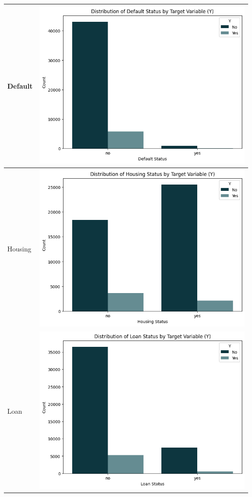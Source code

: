 \documentclass{article}
\begin{document}
\begin{longtable}{|l|c|}
               Default & \includegraphics[width=0.7\linewidth]{data/bank_marketing/pic/Bank_def.png} \\ \hline 
               Housing & \includegraphics[width=0.7\linewidth]{data/bank_marketing/pic/Bank_Hous.png} \\ \hline
               Loan & \includegraphics[width=0.7\linewidth]{data/bank_marketing/pic/Bank_loan.png} \\ \hline 

\end{longtable}
\end{document}
